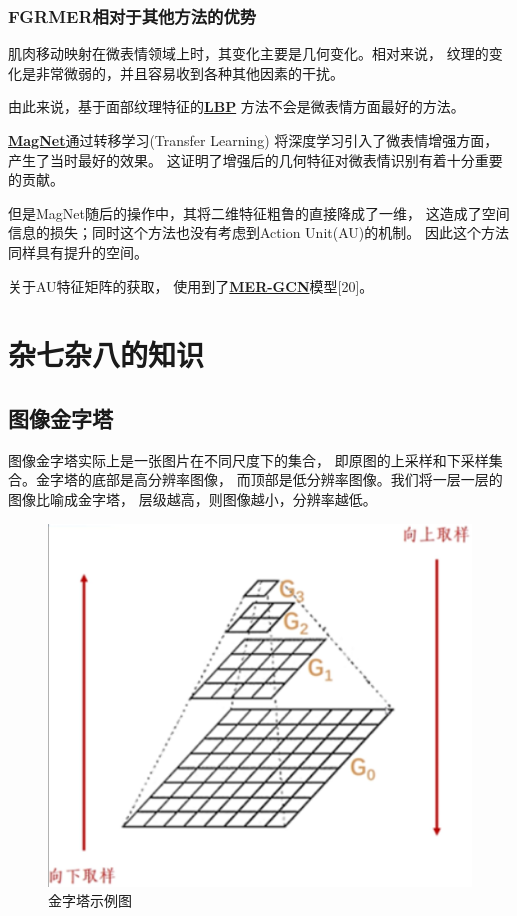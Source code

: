 \documentclass[AutoFakeBold]{MyFormat}
\begin{document}
\subsection{FGRMER相对于其他方法的优势}
\par 肌肉移动映射在微表情领域上时，其变化主要是几何变化。相对来说，
纹理的变化是非常微弱的，并且容易收到各种其他因素的干扰。
\par 由此来说，基于面部纹理特征的\textbf{\Large \underline{LBP}}
方法不会是微表情方面最好的方法。
\\\hspace*{\fill}
\par \textbf{\Large \underline{MagNet}}通过转移学习(Transfer Learning)
将深度学习引入了微表情增强方面，产生了当时最好的效果。
这证明了增强后的几何特征对微表情识别有着十分重要的贡献。
\par 但是MagNet随后的操作中，其将二维特征粗鲁的直接降成了一维，
这造成了空间信息的损失；同时这个方法也没有考虑到Action Unit(AU)的机制。
因此这个方法同样具有提升的空间。
\\\hspace*{\fill}

\par 关于AU特征矩阵的获取，
使用到了\textbf{\Large \underline{MER-GCN}}模型[20]。




\chapter{杂七杂八的知识}

\section{图像金字塔}
\par 图像金字塔实际上是一张图片在不同尺度下的集合，
即原图的上采样和下采样集合。金字塔的底部是高分辨率图像，
而顶部是低分辨率图像。我们将一层一层的图像比喻成金字塔，
层级越高，则图像越小，分辨率越低。
\begin{figure}[!h]
    \centering
    \includegraphics[width=0.4\linewidth]{figures/2022.05.24/pic16.png}
    \caption{金字塔示例图}
\end{figure}
\end{document}
